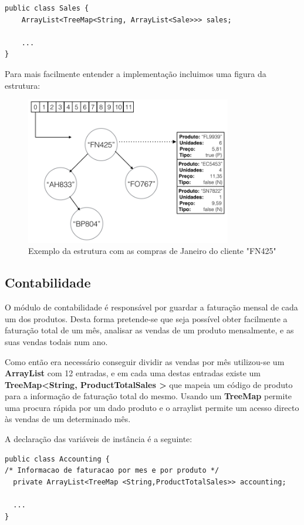 \documentclass[10pt] {article}
\begin{document}
\begin{lstlisting}
public class Sales {
	ArrayList<TreeMap<String, ArrayList<Sale>>> sales;

	...
}
\end{lstlisting}

Para mais facilmente entender a implementação incluimos uma figura da estrutura:

\begin{figure}[ht!]
\centering
\includegraphics[width=90mm]{sales.png}
\caption{Exemplo da estrutura com as compras de Janeiro do cliente "FN425"}
\label{fig:sales}
\end{figure}

\subsection{Contabilidade\label{contabilidade}}

O módulo de contabilidade é responsável por guardar a faturação mensal de cada um dos produtos.
Desta forma pretende-se que seja possível obter facilmente a faturação total de um mês, analisar as vendas de um produto mensalmente, e as suas vendas todais num ano.

Como então era necessário conseguir dividir as vendas por mês utilizou-se um\color{blue} \textbf{ArrayList} \color{black} com 
12 entradas, e em cada uma destas entradas existe um \color{blue} \textbf{TreeMap\textless String, ProductTotalSales
\textgreater} \color{black} que mapeia um código de produto para a informação de faturação total do mesmo.
Usando um \color{blue} \textbf{TreeMap} \color{black} permite uma procura rápida por um dado produto e o arraylist permite um 
acesso directo às vendas de um determinado mês.

A declaração das variáveis de instância é a seguinte:

\begin{lstlisting}
public class Accounting {
/* Informacao de faturacao por mes e por produto */
  private ArrayList<TreeMap <String,ProductTotalSales>> accounting;

  ...
}

\end{lstlisting}
\end{document}

